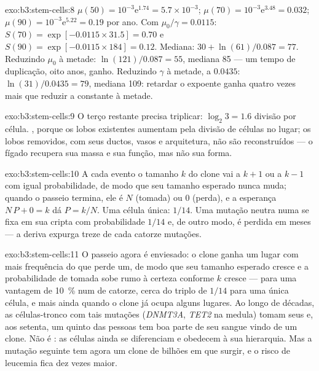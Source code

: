 \begin{solution}{exo:b3:stem-cells:8}
$\mu(50) = 10^{-3}\mathrm{e}^{1.74} = 5.7\times 10^{-3}$; $\mu(70) =
10^{-3}\mathrm{e}^{3.48} = 0.032$; $\mu(90) = 10^{-3}\mathrm{e}^{5.22} =
0.19$ por ano. Com $\mu_{0}/\gamma = 0.0115$: $S(70) = \exp[-0.0115
\times 31.5] = 0.70$ e $S(90) = \exp[-0.0115\times 184] = 0.12$. Mediana:
$30 + \ln(61)/0.087 = 77$. Reduzindo $\mu_{0}$ à metade:
$\ln(121)/0.087 = 55$, mediana 85 --- um tempo de duplicação, oito anos,
ganho. Reduzindo $\gamma$ à metade, a $0.0435$: $\ln(31)/0.0435 = 79$,
mediana 109: retardar o expoente ganha quatro vezes mais que reduzir a
constante à metade.
\end{solution}

\begin{solution}{exo:b3:stem-cells:9}
O terço restante precisa triplicar: $\log_{2}3 = 1.6$ divisão por célula.
, porque os lobos existentes aumentam pela
divisão de células no lugar; os lobos removidos, com seus ductos, vasos e
arquitetura, não são reconstruídos --- o fígado recupera sua massa e sua
função, mas não sua forma.
\end{solution}

\begin{solution}{exo:b3:stem-cells:10}
A cada evento o tamanho $k$ do clone vai a $k + 1$ ou a $k - 1$ com igual
probabilidade, de modo que seu tamanho esperado nunca muda; quando o
passeio termina, ele é $N$ (tomada) ou $0$ (perda), e a esperança $N\,P + 0 = k$ dá $P = k/N$. Uma célula única: $1/14$. Uma mutação neutra numa
 se fixa em sua cripta com probabilidade $1/14$ e, de outro
modo, é perdida em meses --- a deriva expurga treze de cada catorze
mutações.
\end{solution}

\begin{solution}{exo:b3:stem-cells:11}
O passeio agora é enviesado: o clone ganha um lugar com mais frequência
do que perde um, de modo que seu tamanho esperado cresce e a
probabilidade de tomada sobe rumo à certeza conforme $k$ cresce --- para
uma vantagem de \qty{10}{\%} num  de catorze, cerca do triplo de
$1/14$ para uma única célula, e mais ainda quando o clone já ocupa alguns
lugares. Ao longo de décadas, as células-tronco com tais mutações
(\emph{DNMT3A}, \emph{TET2} na medula) tomam seus  e, aos setenta,
um quinto das pessoas tem boa parte de seu sangue vindo de um clone. Não
é : as células ainda se diferenciam e obedecem à sua hierarquia.
Mas a mutação seguinte tem agora um clone de bilhões em que surgir, e o
risco de leucemia fica dez vezes maior.
\end{solution}

